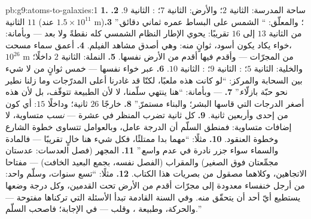 \begin{solution}{pb:g9:atoms-to-galaxies:1}
\textbf{1.} ساحة المدرسة: الثانية $2$؛ والأرض: الثانية $7$؛
 : الثانية $9$.
\textbf{2.} الثانية $11$ (عند $1.5 \times 10^{11}$
\unit{m})؛ والمعلّق: `` الشمس على البساط عمره ثماني
دقائق.''
\textbf{3.} من الثانية $13$ إلى $16$ تقريبًا: يحوي الإطار
النظام الشمسي كله نقطةً ولا  بعد --- وبأمانة: خواء يكاد
يكون أسود، ثوانٍ منه: وهي أصدق مشاهد الفيلم.
\textbf{4.} أعمق سماء مسحت، $10^{26}$ \unit{m} من المجرّات
--- وأقدم  فيها أقدم من الأرض نفسها.
\textbf{5.} النملة: الثانية $2$ داخلًا؛ والخلية: الثانية $5$؛
: الثانية $9$؛ : الثانية $10$.
\textbf{6.} عبر خواء  نفسها --- خمس ثوانٍ من لا شيء بين
السحابة والمركز: ``لو كانت هذه  ملعبًا، لكنّا قد غادرنا
أعلى المدرّجات وما زلنا نطير نحو حبّة بازلّاء.''
\textbf{7.}  --- وبأمانة: ``هنا ينتهي سلّمنا، لا لأن
الطبيعة تتوقّف، بل لأن هذه أصغر الدرجات التي قاسها البشر؛
والبناء مستمرّ.''
\textbf{8.} خارجًا $26$ ثانية؛ وداخلًا $15$: أي كون من إحدى
وأربعين ثانية.
\textbf{9.} كل ثانية تضرب المنظر في عشرة --- \emph{نسب}
متساوية، لا إضافات متساوية: فمنطق السلّم أن الدرجة عامل،
وبالعوامل تتساوى خطوة الشارع وخطوة العنقود.
\textbf{10.} مثلًا: ``مهما بدا ممتلئًا، فكل شيء هنا خالٍ
تقريبًا --- فالمادة والسماء سواء جزر نادرة في عدم واسع.''
\textbf{11.} المجهر (فصل العدسات: عدستان مجمِّعتان فوق
الصغير) والمقراب (الفصل نفسه، بجمع البعيد الخافت) --- مفتاحا
الاتجاهين، وكلاهما مصقول من بصريات هذا الكتاب.
\textbf{12.} مثلًا: ``تسع سنوات، وسلّم واحد: من أرجل خنفساء
معدودة إلى مجرّات أقدم من الأرض تحت القدمين، وكل درجة وضعها
 يستطيع أيّ أحد أن يتحقّق منه. وفي السنة القادمة تبدأ
الأسئلة التي تركناها مفتوحة ---  والحركة، وطبيعة ،
وقلب  --- في الإجابة؛ فاصحب السلّم.''
\end{solution}
